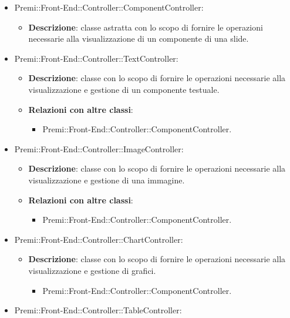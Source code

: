 \begin{itemize}
\begin{itemize}
			\end{itemize}
		\item  Premi::Front-End::Controller::ComponentController: 
			 \begin{itemize}
				\item \textbf{Descrizione}: classe astratta con lo scopo di fornire le operazioni necessarie alla visualizzazione di un componente di una slide.
			\end{itemize}
		\item  Premi::Front-End::Controller::TextController: 
			 \begin{itemize}
				\item \textbf{Descrizione}: classe con lo scopo di fornire le operazioni necessarie alla visualizzazione e gestione di un componente testuale.
				\item \textbf{Relazioni con altre classi}:
				\begin{itemize}
					\item Premi::Front-End::Controller::ComponentController.
				\end{itemize}
			\end{itemize}
		\item  Premi::Front-End::Controller::ImageController: 
			 \begin{itemize}
				\item \textbf{Descrizione}: classe con lo scopo di fornire le operazioni necessarie alla visualizzazione e gestione di una immagine.
				\item \textbf{Relazioni con altre classi}:
				\begin{itemize}
					\item Premi::Front-End::Controller::ComponentController.
				\end{itemize}
			\end{itemize}
		\item  Premi::Front-End::Controller::ChartController: 
			 \begin{itemize}
				\item \textbf{Descrizione}: classe con lo scopo di fornire le operazioni necessarie alla visualizzazione e gestione di grafici.
				\begin{itemize}
					\item Premi::Front-End::Controller::ComponentController.
				\end{itemize}
			 \end{itemize}
		\item  Premi::Front-End::Controller::TableController: 
			 \begin{itemize}

\end{itemize}
\end{itemize}
